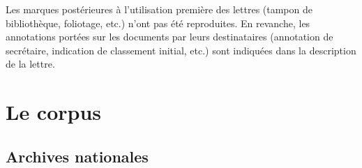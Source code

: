 \documentclass{book}
\begin{document}
\par Les marques postérieures à l’utilisation première des lettres (tampon de bibliothèque, foliotage, etc.) n’ont pas été reproduites. En revanche, les annotations portées sur les documents par leurs destinataires (annotation de secrétaire, indication de classement initial, etc.) sont indiquées dans la description de la lettre.

\section*{Le corpus}
\subsection*{Archives nationales}
\hypertarget{CoEg_Mariette_ms_001}{}
\end{document}
